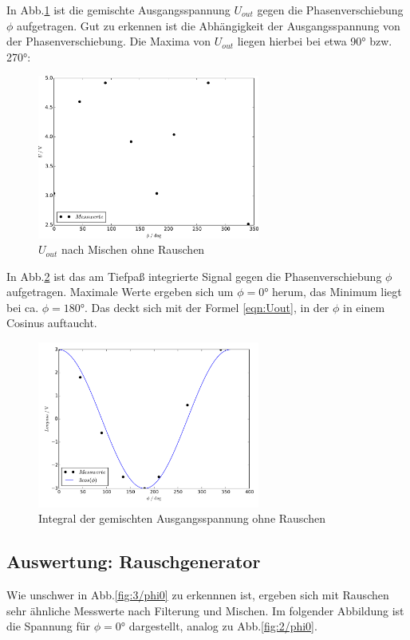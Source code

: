In Abb.\ref{fig:plot2u} ist die gemischte Ausgangsspannung $U_{out}$ gegen die
Phasenverschiebung $\phi$ aufgetragen. Gut zu erkennen ist die Abhängigkeit
der Ausgangsspannung von der Phasenverschiebung. Die Maxima von $U_{out}$
liegen hierbei bei etwa 90° bzw. 270°:
\begin{figure}[H]
  \centering
  \includegraphics[width=0.65\textwidth, height=0.35\textwidth]{plot2u.pdf}
  \caption{$U_{out}$ nach Mischen ohne Rauschen}
  \label{fig:plot2u}
\end{figure}
\newpage
In Abb.\ref{fig:plot2low} ist das am Tiefpaß integrierte Signal gegen die
Phasenverschiebung $\phi$ aufgetragen. Maximale Werte ergeben sich um $\phi = 0°$
herum, das Minimum liegt bei ca. $\phi = 180°$. Das deckt sich mit der Formel
\eqref{eqn:Uout}, in der $\phi$ in einem Cosinus auftaucht.
\begin{figure}[H]
  \centering
  \includegraphics[height=0.35\textwidth,width=0.65\textwidth]{plot2low.pdf}
  \caption{Integral der gemischten Ausgangsspannung ohne Rauschen}
  \label{fig:plot2low}
\end{figure}


\subsection{Auswertung: Rauschgenerator}

Wie unschwer in Abb.\ref{fig:3/phi0} zu erkennnen ist, ergeben sich mit Rauschen
sehr ähnliche
Messwerte nach Filterung und Mischen. Im folgender Abbildung ist die
Spannung für $\phi=0°$ dargestellt, analog zu Abb.\ref{fig:2/phi0}.

